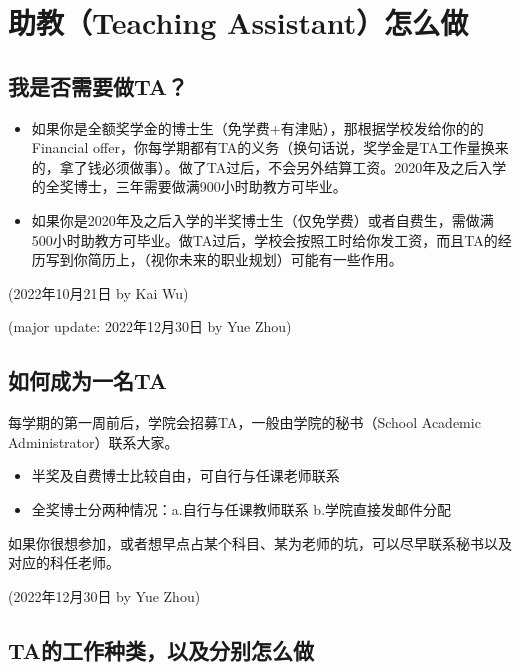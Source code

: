 \section{助教（Teaching Assistant）怎么做}

\subsection{我是否需要做TA？}
\begin{itemize}
    \item 如果你是全额奖学金的博士生（免学费+有津贴），那根据学校发给你的的Financial offer，你每学期都有TA的义务（换句话说，奖学金是TA工作量换来的，拿了钱必须做事）。做了TA过后，不会另外结算工资。2020年及之后入学的全奖博士，三年需要做满900小时助教方可毕业。
    \item 如果你是2020年及之后入学的半奖博士生（仅免学费）或者自费生，需做满500小时助教方可毕业。做TA过后，学校会按照工时给你发工资，而且TA的经历写到你简历上，（视你未来的职业规划）可能有一些作用。
\end{itemize}

\begin{flushright}
    (2022年10月21日 by Kai Wu)

    (major update: 2022年12月30日 by Yue Zhou)
\end{flushright}

\subsection{如何成为一名TA}

每学期的第一周前后，学院会招募TA，一般由学院的秘书（School Academic Administrator）联系大家。
\begin{itemize}
    \item 半奖及自费博士比较自由，可自行与任课老师联系
    \item 全奖博士分两种情况：a.自行与任课教师联系 b.学院直接发邮件分配
\end{itemize}

如果你很想参加，或者想早点占某个科目、某为老师的坑，可以尽早联系秘书以及对应的科任老师。

\begin{flushright}
    (2022年12月30日 by Yue Zhou)
\end{flushright}

\subsection{TA的工作种类，以及分别怎么做}

